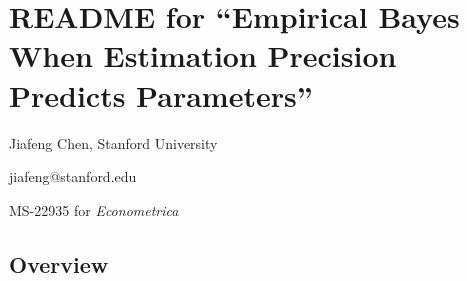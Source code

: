\documentclass[10pt]{article}
\author{Jiafeng Chen, Stanford University}
\date{\today}
\begin{document}
\hypertarget{template-readme-and-guidance}{%
\section{README for ``Empirical Bayes When Estimation Precision Predicts Parameters''}
\label{template-readme-and-guidance}}

\noindent Jiafeng Chen, Stanford University

\noindent jiafeng@stanford.edu

\noindent MS-22935 for \emph{Econometrica}


\hypertarget{overview}{%
\subsection{Overview}\label{overview}}

\end{document}
